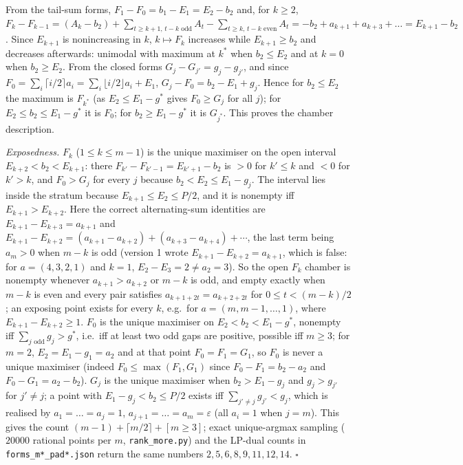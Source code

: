 \documentclass[
  11pt,
  a4paper,
]{article}
\newcounter{none} %
\begin{document}
From the tail-sum forms, \(F_1-F_0=b_1-E_1=E_2-b_2\) and, for \(k\ge2\),
\(F_k-F_{k-1}=(A_k-b_2)+\sum_{t\ge k+1,\allowbreak{}\,\allowbreak{}t-k\text{ odd}}A_t-\sum_{t\ge k,\allowbreak{}\,\allowbreak{}t-k\text{ even}}A_t=-b_2+a_{k+1}+a_{k+3}+\dots=E_{k+1}-b_2\).
Since \(E_{k+1}\) is nonincreasing in \(k\), \(k\mapsto F_k\) increases
while \(E_{k+1}\ge b_2\) and decreases afterwards: unimodal with maximum
at \(k^*\) when \(b_2\le E_2\) and at \(k=0\) when \(b_2\ge E_2\). From
the closed forms \(G_j-G_{j'}=g_j-g_{j'}\), and since
\(F_0=\sum_i\lceil i/2\rceil a_i=\sum_i\lfloor i/2\rfloor a_i+E_1\),
\(G_j-F_0=b_2-E_1+g_j\). Hence for \(b_2\le E_2\) the maximum is
\(F_{k^*}\) (as \(E_2\le E_1-g^*\) gives \(F_0\ge G_j\) for all \(j\));
for \(E_2\le b_2\le E_1-g^*\) it is \(F_0\); for \(b_2\ge E_1-g^*\) it
is \(G_{j^*}\). This proves the chamber description.

\emph{Exposedness.} \(F_k\) (\(1\le k\le m-1\)) is the unique maximiser
on the open interval \(E_{k+2}<b_2<E_{k+1}\): there
\(F_{k'}-F_{k'-1}=E_{k'+1}-b_2\) is \(>0\) for \(k'\le k\) and \(<0\)
for \(k'>k\), and \(F_0>G_j\) for every \(j\) because
\(b_2<E_2\le E_1-g_j\). The interval lies inside the stratum because
\(E_{k+1}\le E_2\le P/2\), and it is nonempty iff \(E_{k+1}>E_{k+2}\).
Here the correct alternating-sum identities are
\(E_{k+1}-E_{k+3}=a_{k+1}\) and
\(E_{k+1}-E_{k+2}=(a_{k+1}-a_{k+2})+(a_{k+3}-a_{k+4})+\cdots\), the last
term being \(a_m>0\) when \(m-k\) is odd (version 1 wrote
\(E_{k+1}-E_{k+2}=a_{k+1}\), which is false: for \(a=(4,\allowbreak{}3,\allowbreak{}2,\allowbreak{}1)\) and
\(k=1\), \(E_2-E_3=2\ne a_2=3\)). So the open \(F_k\) chamber is
nonempty whenever \(a_{k+1}>a_{k+2}\) or \(m-k\) is odd, and empty
exactly when \(m-k\) is even and every pair satisfies
\(a_{k+1+2t}=a_{k+2+2t}\) for \(0\le t<(m-k)/2\); an exposing point
exists for every \(k\), e.g.~for \(a=(m,\allowbreak{}m-1,\allowbreak{}\dots,\allowbreak{}1)\), where
\(E_{k+1}-E_{k+2}\ge1\). \(F_0\) is the unique maximiser on
\(E_2<b_2<E_1-g^*\), nonempty iff \(\sum_{j\text{ odd}}g_j>g^*\),
i.e.~iff at least two odd gaps are positive, possible iff \(m\ge3\); for
\(m=2\), \(E_2=E_1-g_1=a_2\) and at that point \(F_0=F_1=G_1\), so
\(F_0\) is never a unique maximiser (indeed \(F_0\le\max(F_1,\allowbreak{}G_1)\)
since \(F_0-F_1=b_2-a_2\) and \(F_0-G_1=a_2-b_2\)). \(G_j\) is the
unique maximiser when \(b_2>E_1-g_j\) and \(g_j>g_{j'}\) for
\(j'\ne j\); a point with \(E_1-g_j<b_2\le P/2\) exists iff
\(\sum_{j'\ne j}g_{j'}<g_j\), which is realised by \(a_1=\dots=a_j=1\),
\(a_{j+1}=\dots=a_m=\varepsilon\) (all \(a_i=1\) when \(j=m\)). This
gives the count \((m-1)+\lceil m/2\rceil+[m\ge3]\); exact unique-argmax
sampling (\(20000\) rational points per \(m\), {\small\texttt{rank\_\allowbreak{}more.\allowbreak{}py}})
and the LP-dual counts in {\small\texttt{forms\_\allowbreak{}m*\_\allowbreak{}pad*.\allowbreak{}json}} return the same
numbers \(2,\allowbreak{}5,\allowbreak{}6,\allowbreak{}8,\allowbreak{}9,\allowbreak{}11,\allowbreak{}12,\allowbreak{}14\). \(\square\)
\end{document}
